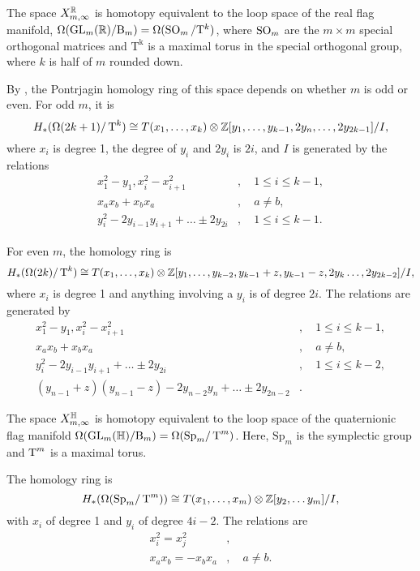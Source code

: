 \begin{theorem}
  The space $X_{m,\infty}^{\mathbb{R}}$ is homotopy equivalent to the loop space
  of the real flag manifold,
  $\Omega(\operatorname{GL}_m(\mathbb{R})/\mathrm{B}_m) = \Omega(\operatorname{SO}_m/\mathrm{T}^{k})$, where
  $\operatorname{SO}_m$ are the $m \times m$ special orthogonal matrices and
  $\mathrm{T^k}$ is a maximal torus in the special orthogonal group,
  where $k$ is half of $m$ rounded down.
  
  By \cite{grbic}, the Pontrjagin homology ring of this space depends
  on whether $m$ is odd or even. For odd $m$, it is
  \[ H_*(\Omega(2k+1)/\operatorname{T}^k) \cong T(x_1,\dots,x_k)\otimes
  \mathbb{Z}[y_1,\dots,y_{k-1},2y_n,\dots,2y_{2k-1}] / I, \]
  where $x_i$ is degree 1, the degree of $y_i$ and $2y_i$ is
  $2i$, and $I$ is generated by the relations
  \begin{align*}
    x_1^2-y_1, x_i^2-x_{i+1}^2&,\quad 1 \leq i \leq k-1, \\
    x_a x_b + x_b x_a&,\quad a \neq b, \\
    y_i^2-2y_{i-1}y_{i+1}+\dots\pm 2y_{2i}&,\quad 1 \leq i \leq k-1.
  \end{align*}

  For even $m$, the homology ring is
  \[ H_*(\Omega(2k)/\operatorname{T}^k) \cong T(x_1,\dots,x_k)\otimes
  \mathbb{Z}[y_1,\dots,y_{k-2},y_{k-1}+z,y_{k-1}-z,2y_k\dots,2y_{2k-2}] /
  I, \]
  where $x_i$ is degree 1 and anything involving a $y_i$ is of degree
  $2i$. The relations are generated by
  \begin{align*}
    x_1^2-y_1, x_i^2-x_{i+1}^2&, \quad 1 \leq i \leq k-1, \\
    x_ax_b+x_bx_a&, \quad a\neq b, \\
    y_i^2-2y_{i-1}y_{i+1}+\dots\pm 2y_{2i}&,\quad 1 \leq i \leq k-2,
    \\
    (y_{n-1}+z)(y_{n-1}-z)-2y_{n-2}y_n+\dots\pm 2y_{2n-2}&. 
  \end{align*}
\end{theorem}

\begin{theorem}
  The space $X_{m,\infty}^{\mathbb{H}}$ is homotopy equivalent to the loop
  space of the quaternionic flag manifold
  $\Omega(\operatorname{GL}_m(\mathbb{H})/\mathrm{B}_m) = \Omega(\mathrm{Sp}_m/\operatorname{T}^m)$.
  Here, $\mathrm{Sp}_m$ is the symplectic group and $\operatorname{T}^m$ is a
  maximal torus.

  The homology ring is
  \[ H_*(\Omega(\mathrm{Sp}_m/\operatorname{T}^m)) \cong T(x_1,\dots,x_m)\otimes
  \mathbb{Z}[y_2,\dots y_m] / I, \]
  with $x_i$ of degree 1 and $y_i$ of degree $4i-2$. The relations are
  \begin{align*}
    x_i^2 = x_j^2&,\\
    x_a x_b = -x_b x_a&, \quad a\neq b.
  \end{align*}
\end{theorem}

